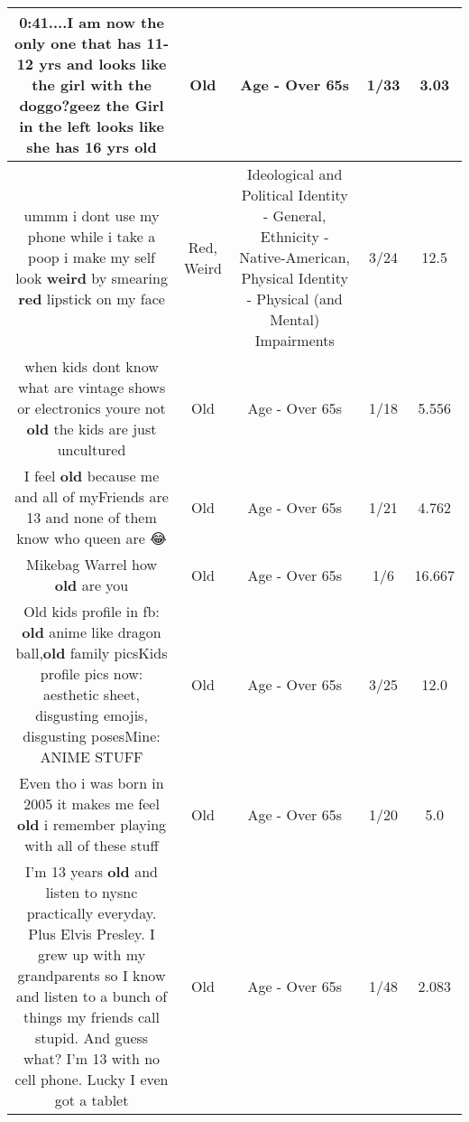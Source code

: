 \documentclass[11pt]{article}
\newlength\mylength
\begin{document}
\begin{center}
\begin{longtable}{|C{.65\mylength}|C{.30\mylength}|C{.12\mylength}|C{.12\mylength}|C{.12\mylength}|}
  \small 0:41....I am now the only one that has 11-12 yrs and looks like the girl with the doggo?geez the Girl in the left looks like she has 16 yrs old\normalsize   & Old & Age - Over 65s & 1/33 & 3.03 \\  \hline
  \small ummm i dont use my phone while i take a poop i make my self look \textbf{weird} by smearing \textbf{r\textbf{ed}} lipstick on my face\normalsize   & Red, Weird &  Ideological and Political Identity - General, Ethnicity - Native-American, Physical Identity - Physical (and Mental) Impairments & 3/24 & 12.5 \\  \hline
  \small when kids dont know what are vintage shows or electronics  youre not \textbf{old} the kids are just uncultured\normalsize   & Old & Age - Over 65s & 1/18 & 5.556 \\  \hline
  \small I feel \textbf{old} because me and all of myFriends are 13 and none of them know who queen are 😂\normalsize   & Old & Age - Over 65s & 1/21 & 4.762 \\  \hline
  \small Mikebag Warrel how \textbf{old} are you\normalsize   & Old & Age - Over 65s & 1/6 & 16.667 \\  \hline
  \small Old kids profile in fb: \textbf{old} anime like dragon ball,\textbf{old} family picsKids profile pics now: aesthetic sheet, disgusting emojis, disgusting posesMine: ANIME STUFF\normalsize   & Old & Age - Over 65s & 3/25 & 12.0 \\  \hline
  \small Even tho i was born in 2005 it makes me feel \textbf{old} i remember playing with all of these stuff\normalsize   & Old & Age - Over 65s & 1/20 & 5.0 \\  \hline
  \small I'm 13 years \textbf{old} and listen to nysnc practically everyday.  Plus Elvis Presley. I grew up with my grandparents so I know and listen to a bunch of things my friends call stupid. And guess what? I'm 13 with no cell phone. Lucky I even got a tablet\normalsize   & Old & Age - Over 65s & 1/48 & 2.083 \\  \hline

\end{longtable}
\end{center}
\end{document}
